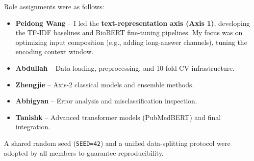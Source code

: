 \documentclass[11pt,a4paper,twocolumn]{article}
\begin{document}
Role assignments were as follows:
\begin{itemize}
  \item \textbf{Peidong Wang} -- I led the \textbf{text-representation axis (Axis 1)}, developing the TF-IDF baselines and BioBERT fine-tuning pipelines. My focus was on optimizing input composition (e.g., adding long-answer channels), tuning the encoding context window.
  \item \textbf{Abdullah} -- Data loading, preprocessing, and 10-fold CV infrastructure.
  \item \textbf{Zhengjie} -- Axis-2 classical models and ensemble methods.
  \item \textbf{Abhigyan} -- Error analysis and misclassification inspection.
  \item \textbf{Tanishk} -- Advanced transformer models (PubMedBERT) and final integration.
\end{itemize}

A shared random seed (\texttt{SEED=42}) and a unified data-splitting protocol were adopted by all members to guarantee reproducibility.
\end{document}
